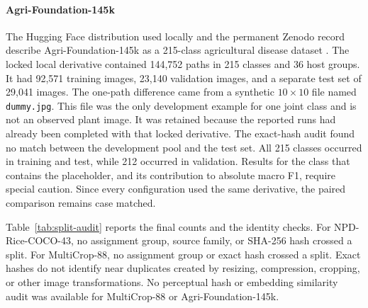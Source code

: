 \documentclass[preprint,12pt]{elsarticle}
\begin{document}
\paragraph{Agri-Foundation-145k}
The Hugging Face distribution used locally and the permanent Zenodo record
describe Agri-Foundation-145k as a 215-class agricultural disease dataset
\cite{agrifoundation_hf,agrifoundation2026}. The locked local derivative
contained 144,752 paths
in 215 classes and 36 host groups. It had 92,571 training images, 23,140
validation images, and a separate test set of 29,041 images. The one-path
difference came from a synthetic $10\times10$ file named \texttt{dummy.jpg}.
This file was the only development example for one joint class and is not an
observed plant image. It was retained because the reported runs had already
been completed with that locked derivative. The exact-hash audit found no match
between the development pool and the test set. All 215 classes occurred in
training and test, while 212 occurred in validation. Results for the class that
contains the placeholder, and its contribution to absolute macro F1, require
special caution. Since every configuration used the same derivative, the
paired comparison remains case matched.

Table~\ref{tab:split-audit} reports the final counts and the identity checks.
For NPD-Rice-COCO-43, no assignment group, source family, or SHA-256 hash crossed
a split. For MultiCrop-88, no assignment group or exact hash crossed a split.
Exact hashes do not identify near duplicates created by resizing, compression,
cropping, or other image transformations. No perceptual hash or embedding
similarity audit was available for MultiCrop-88 or Agri-Foundation-145k.

\begin{table}[htbp]
\centering
\caption{Dataset counts and split integrity checks. Counts refer to paths after
the stated exclusions. The local Agri-Foundation-145k total is one path above
the public record because of the disclosed development placeholder.}
\label{tab:split-audit}
\small
{}
\end{table}
\end{document}

